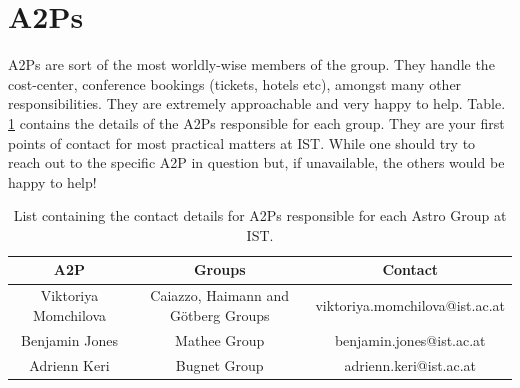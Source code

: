 \documentclass{article}
\begin{document}
\section{A2Ps}
A2Ps are sort of the most worldly-wise members of the group. They handle the cost-center, conference bookings (tickets, hotels etc), amongst many other responsibilities. They are extremely approachable and very happy to help. Table. \ref{tab:A2Ps} contains the details of the A2Ps responsible for each group. They are your first points of contact for most practical matters at IST. While one should try to reach out to the specific A2P in question but, if unavailable, the others would be happy to help!
\begin{table}[h]
    \centering
    \begin{tabular}{c|c|c}
       A2P  & Groups & Contact \\
       \hline
        Viktoriya Momchilova  & Caiazzo, Haimann and Götberg Groups & viktoriya.momchilova@ist.ac.at\\
        Benjamin Jones & Mathee Group & benjamin.jones@ist.ac.at\\
        Adrienn Keri & Bugnet Group & adrienn.keri@ist.ac.at \\
        \hline
        
    \end{tabular}
    \caption{List containing the contact details for A2Ps responsible for each Astro Group at IST. }
    \label{tab:A2Ps}
\end{table}
\end{document}
